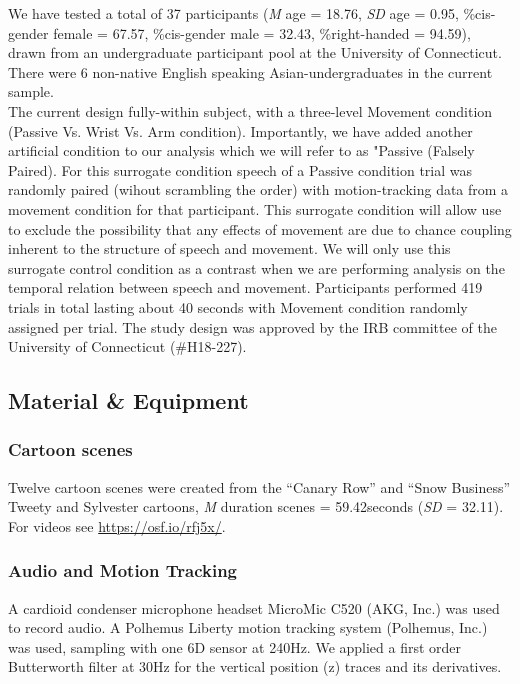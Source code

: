 \documentclass[
  man, noextraspace,floatsintext]{apa6}
\begin{document}
We have tested a total of 37 participants (\emph{M} age = 18.76, \emph{SD} age = 0.95, \%cis-gender female = 67.57, \%cis-gender male = 32.43, \%right-handed = 94.59), drawn from an undergraduate participant pool at the University of Connecticut. There were 6 non-native English speaking Asian-undergraduates in the current sample.\\
The current design fully-within subject, with a three-level Movement condition (Passive Vs. Wrist Vs. Arm condition). Importantly, we have added another artificial condition to our analysis which we will refer to as "Passive (Falsely Paired). For this surrogate condition speech of a Passive condition trial was randomly paired (wihout scrambling the order) with motion-tracking data from a movement condition for that participant. This surrogate condition will allow use to exclude the possibility that any effects of movement are due to chance coupling inherent to the structure of speech and movement. We will only use this surrogate control condition as a contrast when we are performing analysis on the temporal relation between speech and movement.
Participants performed 419 trials in total lasting about 40 seconds with Movement condition randomly assigned per trial. The study design was approved by the IRB committee of the University of Connecticut (\#H18-227).

\hypertarget{material-equipment}{%
\subsection{Material \& Equipment}\label{material-equipment}}

\hypertarget{cartoon-scenes}{%
\subsubsection{Cartoon scenes}\label{cartoon-scenes}}

Twelve cartoon scenes were created from the ``Canary Row'' and ``Snow Business'' Tweety and Sylvester cartoons, \emph{M} duration scenes = 59.42seconds (\emph{SD} = 32.11). For videos see \url{https://osf.io/rfj5x/}.

\hypertarget{audio-and-motion-tracking}{%
\subsubsection{Audio and Motion Tracking}\label{audio-and-motion-tracking}}

A cardioid condenser microphone headset MicroMic C520 (AKG, Inc.) was used to record audio. A Polhemus Liberty motion tracking system (Polhemus, Inc.) was used, sampling with one 6D sensor at 240Hz. We applied a first order Butterworth filter at 30Hz for the vertical position (z) traces and its derivatives.
\end{document}
